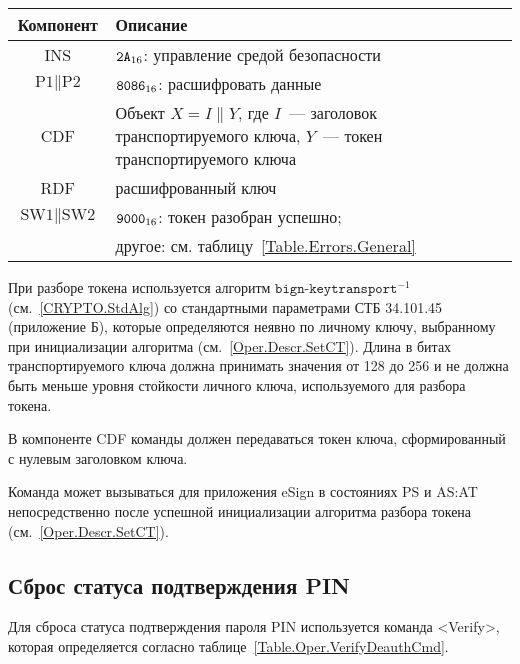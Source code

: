 \begin{table}[hbt]
\caption{}\label{Table.Oper.DecipherCmd}
\begin{tabular}{|c|p{14cm}|}
\hline
Компонент & Описание\\ 
\hline
\hline
INS & $\texttt{2A}_{16}$: управление средой безопасности \\
\hline
$\text{P1} \parallel \text{P2}$ & $\texttt{8086}_{16}$: расшифровать
данные \\ 
\hline
CDF & Объект $X=I \| Y$, где $I$~--- заголовок транспортируемого ключа, 
$Y$~--- токен транспортируемого ключа \\
\hline 
RDF &  расшифрованный ключ \\
\hline
$\text{SW1} \parallel \text{SW2}$ & $\texttt{9000}_{16}$: 
токен разобран успешно;\\
& другое: см. таблицу~\ref{Table.Errors.General} \\
\hline
\end{tabular}
\end{table}

При разборе токена используется алгоритм $\texttt{bign-keytransport}^{-1}$
(см.~\ref{CRYPTO.StdAlg})
со стандартными параметрами СТБ 34.101.45 (приложение Б),
которые определяются неявно по личному ключу,
выбранному при инициализации алгоритма (см.~\ref{Oper.Descr.SetCT}).
Длина в битах транспортируемого ключа должна принимать значения
от 128 до 256 и не должна быть меньше уровня стойкости 
личного ключа, используемого для разбора токена.

В компоненте CDF команды должен передаваться токен ключа, 
сформированный с нулевым заголовком ключа. 

Команда может вызываться для приложения eSign в состояниях 
PS и AS:AT непосредственно после успешной инициализации 
алгоритма разбора токена (см.~\ref{Oper.Descr.SetCT}).




\subsection{Сброс статуса подтверждения PIN}
\label{Oper.Descr.VerifyDeauth}

Для сброса статуса подтверждения пароля PIN
используется команда <Verify>,
которая определяется согласно 
таблице~\ref{Table.Oper.VerifyDeauthCmd}.

